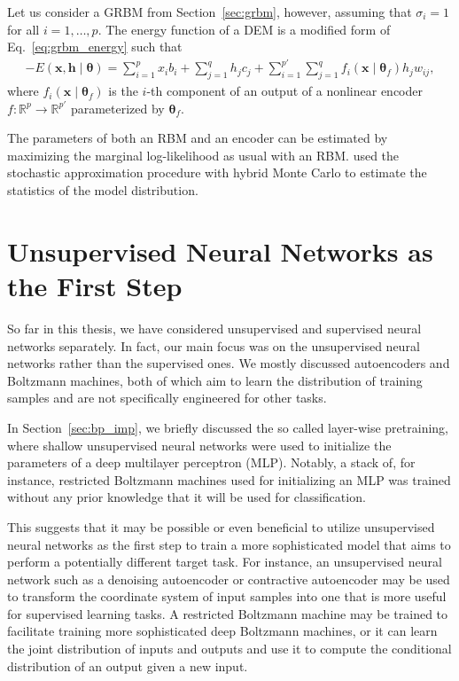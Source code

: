 \documentclass{now}
\newcommand{\vect}[1]{\mathbf{#1}}
\newcommand{\vects}[1]{\boldsymbol{#1}}
\newcommand{\vh}[0]{\vect{h}}
\newcommand{\vx}[0]{\vect{x}}
\newcommand{\TT}[0]{{\vects{\theta}}}
\newcommand{\RR}[0]{\mathbb{R}}
\begin{document}
Let us consider a GRBM from Section~\ref{sec:grbm}, however,
assuming that $\sigma_i=1$ for all $i=1,\dots,p$. The energy
function of a DEM is a modified form of
Eq.~\eqref{eq:grbm_energy} such that
\begin{align*}
    \label{eq:dem_energy}
    -E(\vx, \vh \mid \TT) = \sum_{i=1}^p x_i b_i
    + \sum_{j=1}^q h_j c_j +
    \sum_{i=1}^{p'} \sum_{j=1}^q f_i(\vx\mid \TT_f) h_j
    w_{ij},
\end{align*}
where $f_i(\vx \mid \TT_f)$ is the $i$-th component of an
output of a nonlinear encoder $f:\RR^p \to \RR^{p'}$
parameterized by $\TT_f$.

The parameters of both an RBM and an encoder can be
estimated by maximizing the marginal log-likelihood as usual
with an RBM. \citet{Ngiam2011} used the stochastic
approximation procedure with hybrid Monte Carlo
\citep{Neal1993} to estimate the statistics of the model
distribution.


\chapter{Unsupervised Neural Networks as the First Step}
\label{chap:pretraining}

So far in this thesis, we have considered unsupervised
and supervised neural networks separately.  In fact, our
main focus was on the unsupervised neural networks rather
than the supervised ones. We mostly discussed
autoencoders and Boltzmann machines, both of which aim to
learn the distribution of training samples and are not
specifically engineered for other tasks.

In Section~\ref{sec:bp_imp}, we briefly discussed the so
called layer-wise pretraining, where shallow
unsupervised neural networks were used to initialize the
parameters of a deep multilayer perceptron (MLP). Notably,
a stack of, for instance, restricted Boltzmann machines used
for initializing an MLP was trained without any prior
knowledge that it will be used for classification.

This suggests that it may be possible or even beneficial
to utilize unsupervised neural networks as the first step to
train a more sophisticated model that aims to perform a
potentially different target task. For instance, an
unsupervised neural network such as a denoising autoencoder
or contractive autoencoder may be used to transform the
coordinate system of input samples into one that is more
useful for supervised learning tasks. A restricted Boltzmann machine
may be trained to facilitate training more sophisticated
deep Boltzmann machines, or it can learn the joint
distribution of inputs and outputs and use it to compute the
conditional distribution of an output given a new input.
\end{document}
